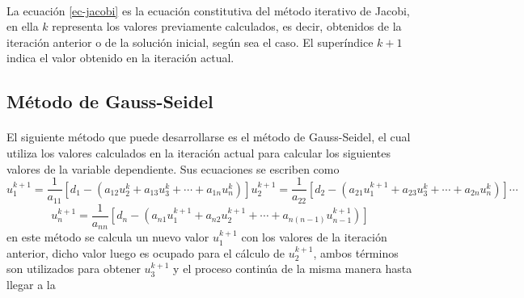 \documentclass[letterpaper, openright, 12pt]{book}
\begin{document}
    \paragraph*{}
        La ecuación \ref{ec-jacobi} es la ecuación constitutiva del método
        iterativo de Jacobi, en ella $k$ representa los valores previamente
        calculados, es decir, obtenidos de la iteración anterior o de la
        solución inicial, según sea el caso. El superíndice $k+1$ indica el
        valor obtenido en la iteración actual.
    \subsection{Método de Gauss-Seidel}
    \paragraph*{}
        El siguiente método que puede desarrollarse es el método de Gauss-Seidel,
        el cual utiliza los valores calculados en la iteración actual para
        calcular los siguientes valores de la variable dependiente. Sus
        ecuaciones se escriben como
        \begin{subequations}
            \begin{equation*}
                u_{1}^{k+1} = \frac{1}{a_{11}} \left[ d_{1} - \left( a_{12}u_{2}^{k} + a_{13}u_{3}^{k} + \dotsb + a_{1n}u_{n}^k \right) \right]
            \end{equation*}
            \begin{equation*}
                u_{2}^{k+1} = \frac{1}{a_{22}} \left[ d_{2} - \left( a_{21}u_{1}^{k+1} + a_{23}u_{3}^{k} + \dotsb + a_{2n}u_{n}^{k} \right) \right]
            \end{equation*}
            \begin{equation*}
                \dotsb
            \end{equation*}
        \end{subequations}
        \begin{equation}
            u_{n}^{k+1} = \frac{1}{a_{nn}} \left[ d_{n} - \left( a_{n1}u_{1}^{k+1} + a_{n2}u_{2}^{k+1} + \dotsb + a_{n\left( n-1 \right)}u_{n-1}^{k+1} \right) \right]
            \label{ec-GS}
        \end{equation}
        en este método se calcula un nuevo valor $u_{1}^{k+1}$ con los valores
        de la iteración anterior, dicho valor luego es ocupado para
        el cálculo de $u_{2}^{k+1}$, ambos términos son utilizados para obtener
        $u_{3}^{k+1}$ y el proceso continúa de la misma manera hasta llegar a la
\end{document}
